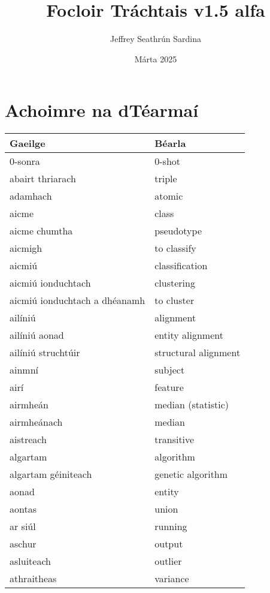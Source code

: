 \documentclass{article}
\title{Focloir Tráchtais v1.5 alfa}
\author{Jeffrey Seathrún Sardina}
\date{Márta 2025}
\begin{document}
\maketitle

\newpage
\tableofcontents

\newpage \section{Achoimre na dTéarmaí}
\begin{longtable}{|l|l|}
	\hline
		\textbf{Gaeilge} & \textbf{Béarla}\\ \hline 
		0-sonra&0-shot\\ \hline 
		abairt thriarach&triple\\ \hline 
		adamhach&atomic\\ \hline 
		aicme&class\\ \hline 
		aicme chumtha&pseudotype\\ \hline 
		aicmigh&to classify\\ \hline 
		aicmiú&classification\\ \hline 
		aicmiú ionduchtach&clustering\\ \hline 
		aicmiú ionduchtach a dhéanamh&to cluster\\ \hline 
		ailíniú&alignment\\ \hline 
		ailíniú aonad&entity alignment\\ \hline 
		ailíniú struchtúir&structural alignment\\ \hline 
		ainmní&subject\\ \hline 
		airí&feature\\ \hline 
		airmheán&median (statistic)\\ \hline 
		airmheánach&median\\ \hline 
		aistreach&transitive\\ \hline 
		algartam&algorithm\\ \hline 
		algartam géiniteach&genetic algorithm\\ \hline 
		aonad&entity\\ \hline 
		aontas&union\\ \hline 
		ar siúl&running\\ \hline 
		aschur&output\\ \hline 
		asluiteach&outlier\\ \hline 
		athraitheas&variance\\ \hline 

\end{longtable}
\end{document}
